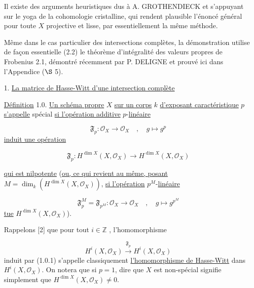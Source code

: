 Il existe des arguments heuristiques dus à A. GROTHENDIECK et s'appuyant sur le yoga de la cohomologie cristalline, qui rendent plausible l'énoncé général pour toute $X$ projective et lisse, par essentiellement la même méthode.

Même dans le cas particulier des intersections complètes, la démonstration utilise de façon essentielle (2.2) le théorème d'intégralité des valeurs propres de Frobenius 2.1, démontré récemment par P. DELIGNE et prouvé ici dans l'Appendice ($\S$ 5).


1. \underline{La matrice de Hasse-Witt d'une intersection complète}

\underline{Définition} 1.0. \underline{Un schéma propre} $X$ \underline{sur un corps} $k$ \underline{d'exposant caractéristique} $p$ \underline{s'appelle} spécial \underline{si l'opération additive} $p$-\underline{linéaire}

\begin{equation}\tag{1.0.1}
\mathfrak{F}_p : \mathcal{O}_X \longrightarrow \mathcal{O}_X \quad , \quad g \longmapsto g^p
\end{equation}
\underline{induit une opération}

\begin{equation}\tag{1.0.2}
\mathfrak{F}_p : H^{\dim X}(X,\mathcal{O}_X) \longrightarrow H^{\dim X}(X,\mathcal{O}_X) 
\end{equation}


 \underline{qui est nilpotente} (\underline{ou, ce qui revient au même, posant} $M = \dim_k(H^{\dim X}(X,\mathcal{O}_X))$, \underline{si l'opération} $p^M$-\underline{linéaire}

\begin{equation}\tag{1.0.3}
\mathfrak{F}_p^M = \mathfrak{F}_{p^M} : \mathcal{O}_X \longrightarrow \mathcal{O}_X \quad , \quad g \longmapsto g^{p^M}
\end{equation}
\underline{tue} $H^{\dim X}(X,\mathcal{O}_X)$).

Rappelons [2] que pour tout $i \in \mathbb{Z}$ , l'homomorphisme

\begin{equation*}
H^i(X,\mathcal{O}_X) \stackrel{\mathfrak{F}_p}{\longrightarrow} H^i(X,\mathcal{O}_X)
\end{equation*}
induit par (1.0.1) s'appelle classiquement \underline{l'homomorphisme de Hasse-Witt} dans $H^i(X,\mathcal{O}_X)$. On notera que si $p = 1$, dire que $X$ est non-spécial signifie simplement que $H^{\dim X}(X,\mathcal{O}_X) \neq 0$.

